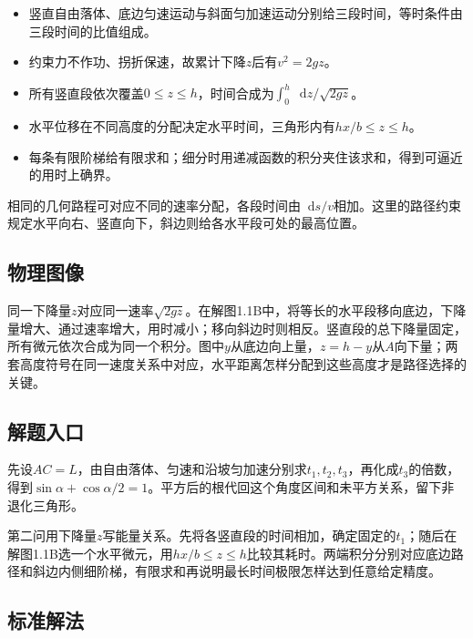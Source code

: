 \documentclass[UTF8,fontset=fandol,a4paper,11pt]{ctexart}
\newcommand{\dd}{\mathop{}\!\mathrm{d}}
\begin{document}
\begin{itemize}
\item 竖直自由落体、底边匀速运动与斜面匀加速运动分别给三段时间，等时条件由三段时间的比值组成。
\item 约束力不作功、拐折保速，故累计下降$z$后有$v^2=2gz$。
\item 所有竖直段依次覆盖$0\le z\le h$，时间合成为$\int_0^h\dd z/\sqrt{2gz}$。
\item 水平位移在不同高度的分配决定水平时间，三角形内有$hx/b\le z\le h$。
\item 每条有限阶梯给有限求和；细分时用递减函数的积分夹住该求和，得到可逼近的用时上确界。
\end{itemize}
相同的几何路程可对应不同的速率分配，各段时间由$\dd s/v$相加。这里的路径约束规定水平向右、竖直向下，斜边则给各水平段可处的最高位置。




\subsection*{物理图像}

同一下降量$z$对应同一速率$\sqrt{2gz}$。在解图1.1B中，将等长的水平段移向底边，下降量增大、通过速率增大，用时减小；移向斜边时则相反。竖直段的总下降量固定，所有微元依次合成为同一个积分。图中$y$从底边向上量，$z=h-y$从$A$向下量；两套高度符号在同一速度关系中对应，水平距离怎样分配到这些高度才是路径选择的关键。



\subsection*{解题入口}

先设$AC=L$，由自由落体、匀速和沿坡匀加速分别求$t_1,t_2,t_3$，再化成$t_3$的倍数，得到$\sin\alpha+\cos\alpha/2=1$。平方后的根代回这个角度区间和未平方关系，留下非退化三角形。

第二问用下降量$z$写能量关系。先将各竖直段的时间相加，确定固定的$t_1$；随后在解图1.1B选一个水平微元，用$hx/b\le z\le h$比较其耗时。两端积分分别对应底边路径和斜边内侧细阶梯，有限求和再说明最长时间极限怎样达到任意给定精度。



\subsection*{标准解法}
\end{document}
